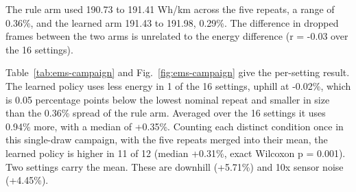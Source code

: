 \documentclass{ieeeaccess}
\begin{document}
The rule arm used 190.73 to 191.41 Wh/km across the five repeats, a range of 0.36\%, and the learned arm 191.43 to 191.98, 0.29\%. The difference in dropped frames between the two arms is unrelated to the energy difference (r = -0.03 over the 16 settings).

Table~\ref{tab:ems-campaign} and Fig.~\ref{fig:ems-campaign} give the per-setting result. The learned policy uses less energy in 1 of the 16 settings, uphill at -0.02\%, which is 0.05 percentage points below the lowest nominal repeat and smaller in size than the 0.36\% spread of the rule arm. Averaged over the 16 settings it uses 0.94\% more, with a median of +0.35\%. Counting each distinct condition once in this single-draw campaign, with the five repeats merged into their mean, the learned policy is higher in 11 of 12 (median +0.31\%, exact Wilcoxon p = 0.001). Two settings carry the mean. These are downhill (+5.71\%) and 10x sensor noise (+4.45\%).
\end{document}
